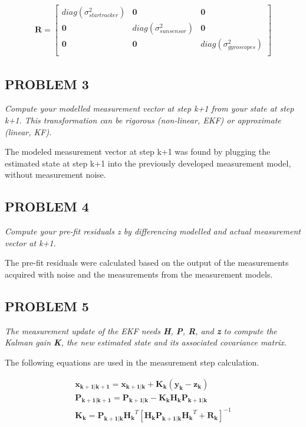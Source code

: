 \begin{align*}
    \mathbf{R} = 
    \begin{bmatrix}
        diag(\sigma_{star tracker}^2) & \mathbf{0} & \mathbf{0} \\
        \mathbf{0} & diag(\sigma_{sun sensor}^2) & \mathbf{0} \\
        \mathbf{0} & \mathbf{0} & diag(\sigma_{gyroscopes}^2)\\
    \end{bmatrix}
\end{align*}

\subsection{PROBLEM 3}
\textit{Compute your modelled measurement vector at step k+1 from your state at step k+1. This transformation can be rigorous (non-linear, EKF) or approximate (linear, KF).}

The modeled measurement vector at step k+1 was found by plugging the estimated state at step k+1 into the previously developed measurement model, without measurement noise.

\subsection{PROBLEM 4}
\textit{Compute your pre-fit residuals \textit{z} by differencing modelled and actual measurement vector at k+1.}

The pre-fit residuals were calculated based on the output of the measurements acquired with noise and the measurements from the measurement models.

\subsection{PROBLEM 5}
\textit{The measurement update of the EKF needs \textbf{H}, \textbf{P}, \textbf{R}, and \textbf{z} to compute the Kalman gain \textbf{K}, the new estimated state and its associated covariance matrix.}

The following equations are used in the measurement step calculation.

\begin{align*}
    \mathbf{x_{k+1 | k+1}} = \mathbf{x_{k+1 | k}} + \mathbf{K_k}
    (\mathbf{y_k} - \mathbf{z_k}) \\
    \mathbf{P_{k+1 | k+1}} = \mathbf{P_{k+1 | k}} - 
    \mathbf{K_k} \mathbf{H_k} \mathbf{P_{k+1 | k}} \\
    \mathbf{K_k} = \mathbf{P_{k+1 | k}} \mathbf{H_k}^T [\mathbf{H_k} \mathbf{P_{k+1 | k}} \mathbf{H_k}^T + \mathbf{R_k}]^{-1}
\end{align*}

